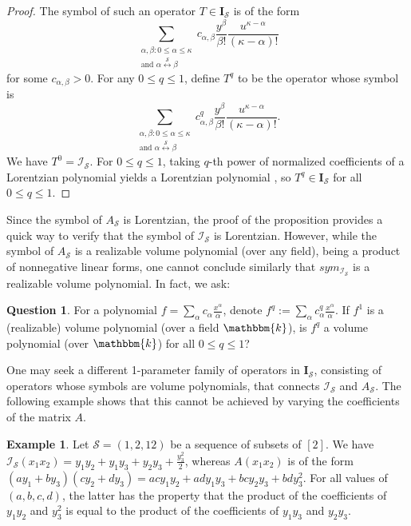 \documentclass{amsart}
\newcommand{\kk}{\mathbbm{k}}
\theoremstyle{plain}
\theoremstyle{definition}
\newtheorem{eg}[thm]{Example}
\newtheorem{?}[thm]{Question}
\begin{document}
\begin{proof}
The symbol of such an operator $T\in \mathbf I_{\mathcal S}$ is of the form
\[
\sum_{\substack{\alpha,\beta: 0\leq \alpha\leq \kappa\\ \text{and } \alpha \overset{\mathcal S}\longleftrightarrow \beta}} c_{\alpha,\beta} \frac{y^\beta}{\beta!} \frac{u^{\kappa-\alpha}}{(\kappa-\alpha)!}
\]
for some $c_{\alpha,\beta} > 0$.  For any $0\leq q\leq 1$, define $T^q$ to be the operator whose symbol is
\[
\sum_{\substack{\alpha,\beta: 0\leq \alpha\leq \kappa\\ \text{and } \alpha \overset{\mathcal S}\longleftrightarrow \beta}} c_{\alpha,\beta}^q \frac{y^\beta}{\beta!} \frac{u^{\kappa-\alpha}}{(\kappa-\alpha)!}.
\]
We have $T^0 = \mathcal I_{\mathcal S}$.  For $0\leq q\leq 1$, taking $q$-th power of normalized coefficients of a Lorentzian polynomial yields a Lorentzian polynomial \cite[Proposition~3.25]{BH20}, so $T^q \in \mathbf I_{\mathcal S}$ for all $0\leq q\leq 1$.
\end{proof}

Since the symbol of $A_{\mathcal S}$ is Lorentzian, the proof of the proposition provides a quick way to verify that the symbol of $\mathcal I_{\mathcal S}$ is Lorentzian.  However, while the symbol of $A_{\mathcal S}$ is a realizable volume polynomial (over any field), being a product of nonnegative linear forms, one cannot conclude similarly that $sym_{\mathcal I_{\mathcal S}}$ is a realizable volume polynomial.  In fact, we ask:

\begin{?}
For a polynomial $f = \sum_\alpha c_\alpha \frac{x^\alpha}{\alpha}$, denote $f^q := \sum_\alpha c_\alpha^q \frac{x^\alpha}{\alpha}$.  If $f^1$ is a (realizable) volume polynomial (over a field $\kk$), is $f^q$ a volume polynomial (over $\kk$) for all $0\leq q \leq 1$?
\end{?} 
 
One may seek a different 1-parameter family of operators in $\mathbf I_{\mathcal S}$, consisting of operators whose symbols are volume polynomials, that connects $\mathcal I_{\mathcal S}$ and $A_{\mathcal S}$.  The following example shows that this cannot be achieved by varying the coefficients of the matrix $A$.

\begin{eg}
Let $\mathcal S = (1,2,12)$ be a sequence of subsets of $[2]$.  We have $\mathcal I_{\mathcal S}(x_1x_2) = y_1y_2 + y_1y_3 + y_2y_3 + \frac{y_3^2}{2}$, whereas $A(x_1x_2)$ is of the form $ (ay_1 + by_3)(cy_2+dy_3) = acy_1y_2 + ady_1y_3 + bcy_2y_3 + bdy_3^2$.  For all values of $(a,b,c,d)$, the latter has the property that the product of the coefficients of $y_1y_2$ and $y_3^2$ is equal to the product of the coefficients of $y_1y_3$ and $y_2y_3$.
\end{eg}
\end{document}
